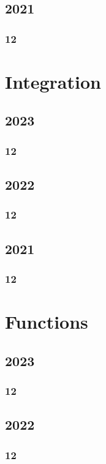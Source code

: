 \documentclass[11pt]{book}
\begin{document}
\section{2021}
\subsection{12}



\chapter{Integration}
\section{2023}
\subsection{12}

\section{2022}
\subsection{12}


\section{2021}
\subsection{12}



\chapter{Functions}
\section{2023}
\subsection{12}

\section{2022}
\subsection{12}

\end{document}
